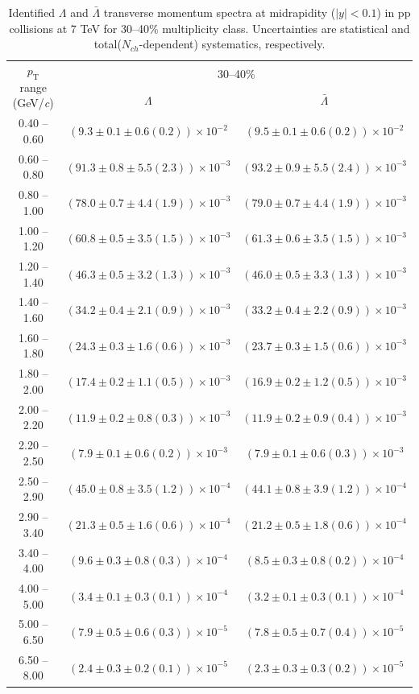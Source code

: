 \begin{table}
\caption{Identified $\Lambda$ and $\bar{\Lambda}$  transverse momentum spectra at midrapidity ($|y|<0.1$) in pp collisions at 7 TeV for 30--40\% multiplicity class. Uncertainties are statistical and total($N_{ch}$-dependent) systematics, respectively.}
\label{tab:Lambda_AntiLambda_30to40}
\begin{center}
\begin{tabular}{ c | c c }
\hline
\multirow{2}{*}{$p_{\mathrm{T}}$ range (GeV/\textit{c})} & \multicolumn{2}{c}{30--40\%} \\ & $\Lambda$& $\bar{\Lambda}$\\ 
\hline
0.40 -- 0.60 & $(9.3\pm0.1\pm0.6(0.2))\times10^{-2}$ & $(9.5\pm0.1\pm0.6(0.2))\times10^{-2}$ \\ 
0.60 -- 0.80 & $(91.3\pm0.8\pm5.5(2.3))\times10^{-3}$ & $(93.2\pm0.9\pm5.5(2.4))\times10^{-3}$ \\ 
0.80 -- 1.00 & $(78.0\pm0.7\pm4.4(1.9))\times10^{-3}$ & $(79.0\pm0.7\pm4.4(1.9))\times10^{-3}$ \\ 
1.00 -- 1.20 & $(60.8\pm0.5\pm3.5(1.5))\times10^{-3}$ & $(61.3\pm0.6\pm3.5(1.5))\times10^{-3}$ \\ 
1.20 -- 1.40 & $(46.3\pm0.5\pm3.2(1.3))\times10^{-3}$ & $(46.0\pm0.5\pm3.3(1.3))\times10^{-3}$ \\ 
1.40 -- 1.60 & $(34.2\pm0.4\pm2.1(0.9))\times10^{-3}$ & $(33.2\pm0.4\pm2.2(0.9))\times10^{-3}$ \\ 
1.60 -- 1.80 & $(24.3\pm0.3\pm1.6(0.6))\times10^{-3}$ & $(23.7\pm0.3\pm1.5(0.6))\times10^{-3}$ \\ 
1.80 -- 2.00 & $(17.4\pm0.2\pm1.1(0.5))\times10^{-3}$ & $(16.9\pm0.2\pm1.2(0.5))\times10^{-3}$ \\ 
2.00 -- 2.20 & $(11.9\pm0.2\pm0.8(0.3))\times10^{-3}$ & $(11.9\pm0.2\pm0.9(0.4))\times10^{-3}$ \\ 
2.20 -- 2.50 & $(7.9\pm0.1\pm0.6(0.2))\times10^{-3}$ & $(7.9\pm0.1\pm0.6(0.3))\times10^{-3}$ \\ 
2.50 -- 2.90 & $(45.0\pm0.8\pm3.5(1.2))\times10^{-4}$ & $(44.1\pm0.8\pm3.9(1.2))\times10^{-4}$ \\ 
2.90 -- 3.40 & $(21.3\pm0.5\pm1.6(0.6))\times10^{-4}$ & $(21.2\pm0.5\pm1.8(0.6))\times10^{-4}$ \\ 
3.40 -- 4.00 & $(9.6\pm0.3\pm0.8(0.3))\times10^{-4}$ & $(8.5\pm0.3\pm0.8(0.2))\times10^{-4}$ \\ 
4.00 -- 5.00 & $(3.4\pm0.1\pm0.3(0.1))\times10^{-4}$ & $(3.2\pm0.1\pm0.3(0.1))\times10^{-4}$ \\ 
5.00 -- 6.50 & $(7.9\pm0.5\pm0.6(0.3))\times10^{-5}$ & $(7.8\pm0.5\pm0.7(0.4))\times10^{-5}$ \\ 
6.50 -- 8.00 & $(2.4\pm0.3\pm0.2(0.1))\times10^{-5}$ & $(2.3\pm0.3\pm0.3(0.2))\times10^{-5}$ \\ 
\hline
\end{tabular}
\end{center}
\end{table}
 
